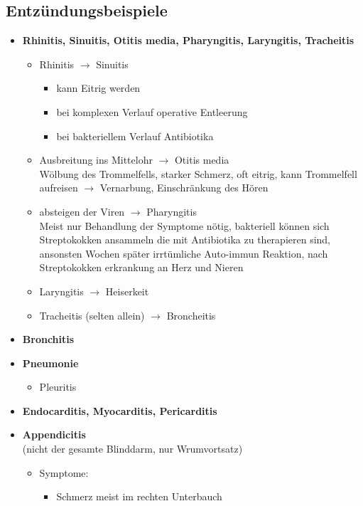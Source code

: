 	\subsection{Entzündungsbeispiele}
		\begin{itemize}
			\item \textbf{Rhinitis, Sinuitis, Otitis media, Pharyngitis, Laryngitis, Tracheitis}
				\begin{itemize}
					\item Rhinitis $\rightarrow$ Sinuitis
						\begin{itemize}
							\item kann Eitrig werden
							\item bei komplexen Verlauf operative Entleerung
							\item bei bakteriellem Verlauf Antibiotika
						\end{itemize}
					\item Ausbreitung ins Mittelohr $\rightarrow$ Otitis media\\
						Wölbung des Trommelfells, starker Schmerz, oft eitrig, kann Trommelfell aufreisen $\rightarrow$ Vernarbung, Einschränkung des Hören
					\item absteigen der Viren $\rightarrow$ Pharyngitis\\
						Meist nur Behandlung der Symptome nötig, bakteriell können sich Streptokokken ansammeln die mit Antibiotika zu therapieren sind, ansonsten Wochen später irrtümliche Auto-immun Reaktion, nach Streptokokken erkrankung an Herz und Nieren
					\item Laryngitis $\rightarrow$ Heiserkeit
					\item Tracheitis (selten allein) $\rightarrow$ Broncheitis
				\end{itemize}
			\item \textbf{Bronchitis}
			\item \textbf{Pneumonie}
				\begin{itemize}
					\item Pleuritis
				\end{itemize}
			\item \textbf{Endocarditis, Myocarditis, Pericarditis}
	\pagebreak
			\item \textbf{Appendicitis}\\
				(nicht der gesamte Blinddarm, nur Wrumvortsatz)
				\begin{itemize}
					\item Symptome:
						\begin{itemize}
						 	\item Schmerz meist im rechten Unterbauch

\end{itemize}
\end{itemize}
\end{itemize}

